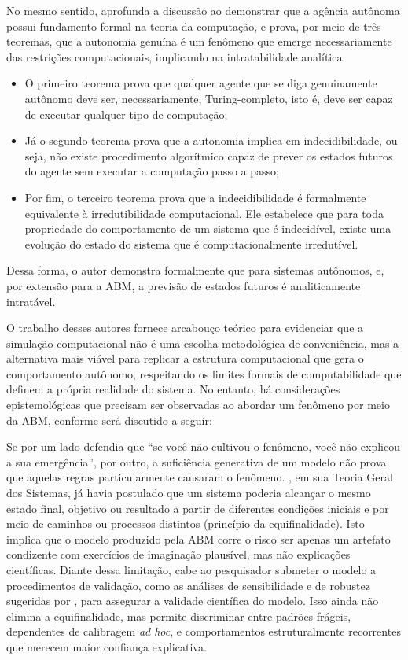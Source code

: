 \documentclass[12pt,oneside,a4paper,brazil,sumario=tradicional]{abntex2}
\begin{document}
No mesmo sentido, \textcite{azadi2025} aprofunda a discussão ao demonstrar que a agência autônoma possui fundamento formal na teoria da computação, e prova, por meio de três teoremas, que a autonomia genuína é um fenômeno que emerge necessariamente das restrições computacionais, implicando na intratabilidade analítica:

\begin{itemize}
  \item O primeiro teorema prova que qualquer agente que se diga genuinamente autônomo deve ser, necessariamente, Turing-completo, isto é, deve ser capaz de executar qualquer tipo de computação;
  \item Já o segundo teorema prova que a autonomia implica em indecidibilidade, ou seja, não existe procedimento algorítmico capaz de prever os estados futuros do agente sem executar a computação passo a passo;
  \item Por fim, o terceiro teorema prova que a indecidibilidade é formalmente equivalente à irredutibilidade computacional. Ele estabelece que para toda propriedade do comportamento de um sistema que é indecidível, existe uma evolução do estado do sistema que é computacionalmente irredutível.
\end{itemize}

Dessa forma, o autor demonstra formalmente que para sistemas autônomos, e, por extensão para a ABM, a previsão de estados futuros é analiticamente intratável.

O trabalho desses autores fornece arcabouço teórico para evidenciar que a simulação computacional não é uma escolha metodológica de conveniência, mas a alternativa mais viável para replicar a estrutura computacional que gera o comportamento autônomo, respeitando os limites formais de computabilidade que definem a própria realidade do sistema. No entanto, há considerações epistemológicas que precisam ser observadas ao abordar um fenômeno por meio da ABM, conforme será discutido a seguir:

Se por um lado \textcite{epstein1999} defendia que “se você não cultivou o fenômeno, você não explicou a sua emergência”, por outro, a suficiência generativa de um modelo não prova que aquelas regras particularmente causaram o fenômeno. \textcite{bertalanffy1977}, em sua Teoria Geral dos Sistemas, já havia postulado que um sistema poderia alcançar o mesmo estado final, objetivo ou resultado a partir de diferentes condições iniciais e por meio de caminhos ou processos distintos (princípio da equifinalidade). Isto implica que o modelo produzido pela ABM corre o risco ser apenas um artefato condizente com exercícios de imaginação plausível, mas não explicações científicas. Diante dessa limitação, cabe ao pesquisador submeter o modelo a procedimentos de validação, como as análises de sensibilidade e de robustez sugeridas por \textcite{wilensky2015}, para assegurar a validade científica do modelo. Isso ainda não elimina a equifinalidade, mas permite discriminar entre padrões frágeis, dependentes de calibragem \textit{ad hoc}, e comportamentos estruturalmente recorrentes que merecem maior confiança explicativa.
\end{document}
